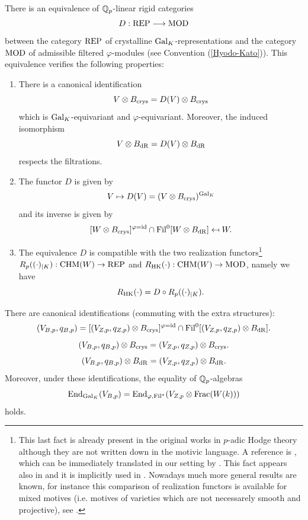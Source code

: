 \documentclass[11pt]{amsart}
\begin{document}
\begin{theorem}\label{tsuji} 
There is an  equivalence of $\mathbb{Q}_p$-linear rigid categories 
\[D : \textnormal{REP} \longrightarrow \textnormal{MOD}\]
between the category $\textnormal{REP}$  of crystalline  $\textnormal{Gal}_K$-representations and the category $\textnormal{MOD}$ of admissible filtered $\varphi$-modules (see Convention (\ref{Hyodo-Kato})). This equivalence verifies the following properties:
\begin{enumerate}
\item\label{tsujican} There is a canonical identification 
\[ V \otimes B_{\textnormal{crys}}=  D(V)\otimes B_{\textnormal{crys}} \]
which is $\textnormal{Gal}_K$-equivariant and $\varphi$-equivariant. Moreover, the induced isomorphism
\[ V \otimes B_{\mathrm{dR}}=  D(V)\otimes B_{\mathrm{dR}} \]
respects the filtrations.

\item The functor $D$ is given by
\[V \mapsto D(V)= (V \otimes B_{\textnormal{crys}})^{\textnormal{Gal}_K}\]
and its inverse is given by
\[ [W\otimes B_{\textnormal{crys}}]^{\varphi=\mathrm{id}} \cap  \textnormal{Fil}^0[W \otimes B_{\mathrm{dR}}] \mapsfrom W.\]

\item The equivalence $D$  is compatible with the two realization functors\footnote{This last fact is already present in the original works in $p$-adic Hodge theory although they are not written down in the motivic language. A reference is 
\cite[Theorem 1.2]{Niziol}, which can be immediately translated in our setting by  \cite[Proposition 4.2.5.1]{Andmot}.   This fact appears also in \cite[3.4.5]{Andmot} and it is implicitly  used in   \cite[7.4.1]{Andmot}. Nowadays much more general results are known, for instance this comparison of realization functors is available for mixed motives (i.e. motives of varieties which are not necessarely smooth and projective), see \cite[4.15]{NiziFred}.}
$R_p ((\cdot)_{\vert K}): \mathrm{CHM}(W) \rightarrow \textnormal{REP}$   and $R_{\mathrm{HK}} (\cdot): \mathrm{CHM}(W)\rightarrow \textnormal{MOD}$, namely we have
\[R_{\mathrm{HK}} (\cdot) = D \circ R_p ((\cdot)_{\vert K}).\]
\end{enumerate}
\end{theorem} 
\begin{corollary}\label{cortsuji}
There are canonical identifications (commuting with the extra structures):
\begin{equation} \label{eq:tsuji}
 (V_{B,p},q_{B,p}) =[(V_{Z,p},q_{Z,p})\otimes B_{\textnormal{crys}}]^{\varphi=\mathrm{id}} \cap  \textnormal{Fil}^0[(V_{Z,p},q_{Z,p})\otimes B_{\mathrm{dR}}].
\end{equation}
\begin{equation}\label{chissa}
 (V_{B,p},q_{B,p}) \otimes B_{\textnormal{crys}}=  (V_{Z,p},q_{Z,p}) \otimes B_{\textnormal{crys}}.
\end{equation}
\begin{equation}\label{chissa2}
 (V_{B,p},q_{B,p}) \otimes B_{\mathrm{dR}}=  (V_{Z,p},q_{Z,p}) \otimes B_{\mathrm{dR}}.
\end{equation}
Moreover, under these identifications,  the  equality of $\mathbb{Q}_p$-algebras  
\begin{equation}\label{stessaalgebra}
 \textnormal{End}_{\textnormal{Gal}_K}(V_{B,p}) = \textnormal{End}_{\varphi,\textnormal{Fil}^*}(V_{Z,p}\otimes \mathrm{Frac}(W(k)))
\end{equation}
holds.
\end{corollary}
\end{document}
